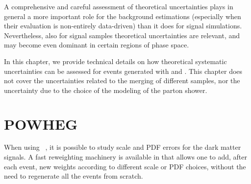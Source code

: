 
A comprehensive and careful assessment of theoretical uncertainties
plays in general a more important role for the background estimations
(especially when their evaluation is non-entirely data-driven) than it
does for signal simulations. Nevertheless, also for signal samples theoretical uncertainties are relevant, and may become even dominant in certain regions of phase space.

In this chapter, we provide technical details on how theoretical systematic uncertainties can be assessed for events generated with \powheg and \madgraph.
This chapter does not cover the uncertainties related to the merging of different samples, nor the uncertainty
due to the choice of the modeling of the parton shower.  



\section{POWHEG}

When using \powheg~\cite{Frixione:2007vw,Alioli:2010xd,Nason:2004rx}, it is
possible to study scale and PDF errors for the dark matter signals. A
fast reweighting machinery is available in  that
allows one to add, after each event, new weights according to
different scale or PDF choices, without the need to regenerate all the
events from scratch. 

